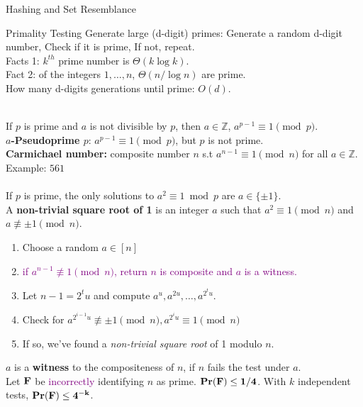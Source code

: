 \documentclass[10pt,a4paper]{article}
\begin{document}
\begin{multicols}{3}
\begin{textbox}{Hashing and Set Resemblance}

\end{textbox}

\begin{textbox}{Primality Testing}
     Generate large (d-digit) primes: 
    Generate a random d-digit number, Check if it is prime, If not, repeat.\\

    Facts 1: $k^{th}$ prime number is $\Theta (k \log k)$.\\
    Fact 2: of the integers $1, \dots, n$, $\Theta(n/\log n)$ are prime.\\
    How many d-digits generations until prime: $O(d)$.

     \\
    If $p$ is prime and $a$ is not divisible by $p$, then $a \in \mathbb{Z}$, $a^{p-1} \equiv 1 \pmod{p}$.\\
    {\bf $a$-Pseudoprime $p$}: $a^{p-1} \equiv 1 \pmod{p}$, but $p$ is not prime.\\
    {\bf Carmichael number:} composite number $n$ s.t $a^{n-1} \equiv 1 \pmod{n}$ for all $a \in \mathbb{Z}$. Example: $561$ \\

     \\
    If $p$ is prime, the only solutions to $a^2 \equiv 1 \bmod p$ are $a \in \{\pm 1\}$. \\
    A {\bf non-trivial square root of 1} is an integer $a$ such that $a^2 \equiv 1 \pmod{n}$ and $a \not\equiv \pm 1 \pmod{n}$.\\
    \begin{enumerate}
        \item Choose a random $a \in [n]$ 
        \item \textcolor{purple}{if $a^{n-1} \not\equiv 1 \pmod{n}$, return $n$ is composite and $a$ is a witness.}
        \item Let $n-1 = 2^tu$ and compute $a^u, a^{2u},\ldots, a^{2^tu}$.
        \item Check for $a^{2^{i-1}u} \not\equiv \pm 1 \pmod{n}, a^{2^iu} \equiv 1 \pmod{n}$
        \item If so, we've found a {\em non-trivial square root} of 1 modulo $n$.
        \end{enumerate}
     $a$ is a {\bf witness} to the compositeness of $n$, if $n$ fails the test under $a$.\\
     Let ${\bf F}$ be \textcolor{purple}{incorrectly} identifying $n$ as prime.  ${\bf Pr(F) \leq 1/4}$. With $k$ independent tests, $ {\bf Pr(F) \leq 4^{-k}}$.
\end{textbox}


\end{multicols}
\end{document}
